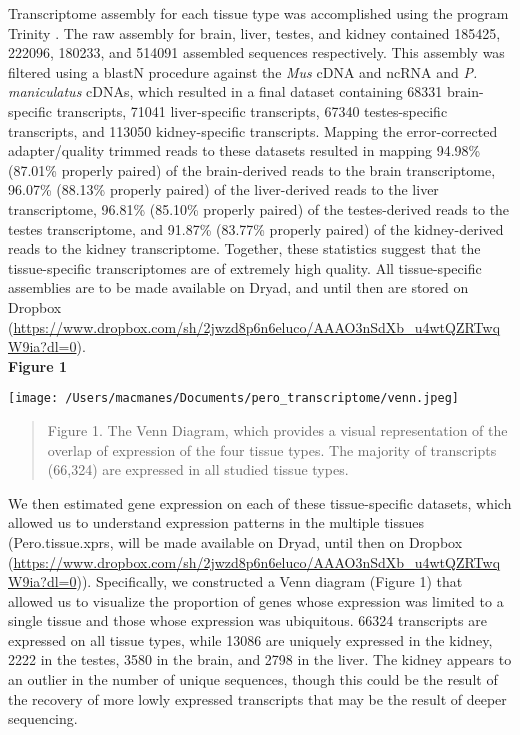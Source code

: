 \documentclass[11pt]{article}
\begin{document}
Transcriptome assembly for each tissue type was accomplished using the program Trinity \cite{Haas:2013jq}. The raw assembly for brain, liver, testes, and kidney contained 185425, 222096, 180233, and 514091 assembled sequences respectively. This assembly was filtered using a blastN procedure against the \textit{Mus} cDNA and ncRNA and \textit{P. maniculatus} cDNAs, which resulted in a final dataset containing 68331 brain-specific transcripts, 71041 liver-specific transcripts, 67340 testes-specific transcripts, and 113050 kidney-specific transcripts. Mapping the error-corrected adapter/quality trimmed reads to these datasets resulted in mapping 94.98\% (87.01\% properly paired) of the brain-derived reads to the brain transcriptome, 96.07\% (88.13\% properly paired) of the liver-derived reads to the liver transcriptome, 96.81\% (85.10\% properly paired) of the testes-derived reads to the testes transcriptome, and 91.87\% (83.77\% properly paired) of the kidney-derived reads to the kidney transcriptome. Together, these statistics suggest that the tissue-specific transcriptomes are of extremely high quality. All tissue-specific assemblies are to be made available on Dryad, and until then are stored on Dropbox (\url{https://www.dropbox.com/sh/2jwzd8p6n6eluco/AAAO3nSdXb_u4wtQZRTwqW9ia?dl=0}). \\

\textbf{\hypertarget{Figure 1}{Figure 1}} \\
\centerline{\texttt{[image: /Users/macmanes/Documents/pero\_transcriptome/venn.jpeg]}}
\begin{quote}
\small{Figure 1. The Venn Diagram, which provides a visual representation of the overlap of expression of the four tissue types. The majority of transcripts (66,324) are expressed in all studied tissue types.}
\end{quote}   

We then estimated gene expression on each of these tissue-specific datasets, which allowed us to understand expression patterns in the multiple tissues (Pero.tissue.xprs, will be made available on Dryad, until then on Dropbox (\url{https://www.dropbox.com/sh/2jwzd8p6n6eluco/AAAO3nSdXb_u4wtQZRTwqW9ia?dl=0})). Specifically, we constructed a Venn diagram ({\hypertarget{Figure 1}{Figure 1}}) that allowed us to visualize the proportion of genes whose expression was limited to a single tissue and those whose expression was ubiquitous. 66324 transcripts are expressed on all tissue types, while 13086 are uniquely expressed in the kidney, 2222 in the testes, 3580 in the brain, and 2798 in the liver. The kidney appears to an outlier in the number of unique sequences, though this could be the result of the recovery of more lowly expressed transcripts that may be the result of deeper sequencing.  \\
\end{document}
